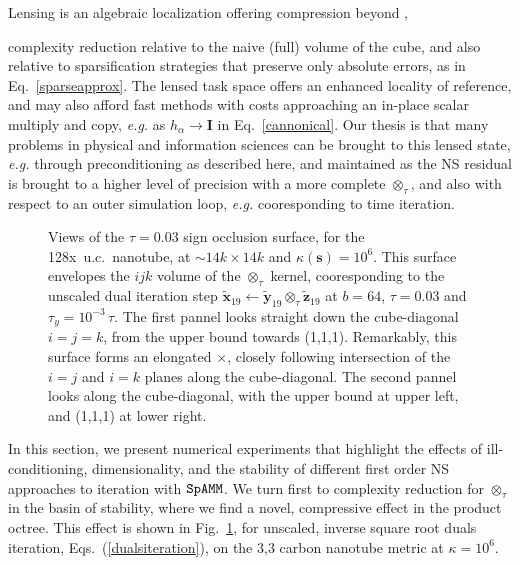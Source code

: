\documentclass[letterpaper,twocolumn,amsmath,amsfont,amssymb,english,aps,jcp,preprintnumbers,groupaddress,nofootinbib,tightenlines]{revtex4}
\newcommand{\mat}[1]{\boldsymbol{#1}}
\newcommand{\mmat}[1]{\widetilde{\boldsymbol{#1}}}
\newcommand{\ot}{ {\scriptstyle \otimes}_{ \tau } }
\begin{document}
Lensing is an algebraic localization offering compression beyond  , 

complexity reduction relative to the naive (full) volume of the cube,
and also relative to sparsification strategies that preserve only absolute errors, as in Eq.~\ref{sparseapprox}.  
The lensed task space offers an enhanced locality of reference, and may also afford fast methods 
with costs approaching an in-place scalar multiply and copy, {\em e.g.} as $h_\alpha \rightarrow \mat{I}$ in Eq.~\ref{cannonical}.
Our thesis is that many problems in physical and information sciences can be brought to this lensed state, {\em e.g.} through preconditioning
as described here, and maintained as the NS residual is brought to a higher level of precision with a more complete $\ot$, 
and also with respect to an outer simulation loop, {\em e.g.} cooresponding to time iteration.



 \begin{figure}[h] \label{markofzorro}
 \caption{Views of the $\tau =0.03$ sign occlusion surface, for the 
 128x~u.c.~nanotube, at $\sim {14k \times 14k}$ and $\kappa(\mat{s})=10^6$. 
 This surface envelopes the $ijk$ volume of the $\ot$ kernel,  
 cooresponding to the unscaled dual iteration step $\mmat{x}_{19} \leftarrow \mmat{y}_{19} \ot \mmat{z}_{19} $ at $b=64$, $\tau=0.03$ and
 $\tau_y=10^{-3} \, \tau $.  The first pannel looks straight down the cube-diagonal $i=j=k$, from the upper bound towards (1,1,1).
 Remarkably, this surface forms an elongated $\times$, closely following intersection of the $i=j$  and $i=k$ planes 
 along the cube-diagonal. The second pannel looks along the cube-diagonal, with the upper bound at upper left, and (1,1,1) at lower right.}
 \end{figure}

In this section, we present  numerical experiments that highlight the effects of 
ill-conditioning, dimensionality, and the stability of different first order NS approaches to iteration with $\tt SpAMM$. 
We turn first to complexity reduction for $\ot$ in the basin of stability,  where we find a novel, compressive 
effect in the product octree.  This effect is shown in Fig.~\ref{markofzorro},  
for unscaled, inverse square root duals iteration, Eqs.~(\ref{dualsiteration}), on the 3,3 carbon 
nanotube metric at $\kappa=10^6$.  
\end{document}
